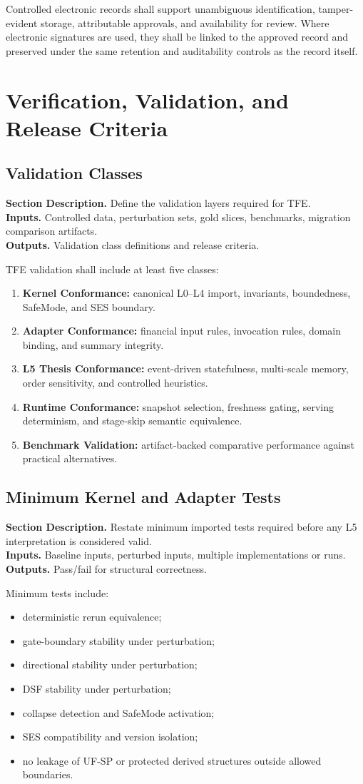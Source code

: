 \documentclass[11pt]{report}
\newcommand{\meta}[3]{\textbf{Section Description.} #1\\
\textbf{Inputs.} #2\\
\textbf{Outputs.} #3\par}
\begin{document}
Controlled electronic records shall support unambiguous identification, tamper-evident storage, attributable approvals, and availability for review. Where electronic signatures are used, they shall be linked to the approved record and preserved under the same retention and auditability controls as the record itself.

\chapter{Verification, Validation, and Release Criteria}
\section{Validation Classes}
\meta{Define the validation layers required for TFE.}{Controlled data, perturbation sets, gold slices, benchmarks, migration comparison artifacts.}{Validation class definitions and release criteria.}

TFE validation shall include at least five classes:
\begin{enumerate}[leftmargin=1.2cm]
    \item \textbf{Kernel Conformance:} canonical L0--L4 import, invariants, boundedness, SafeMode, and SES boundary.
    \item \textbf{Adapter Conformance:} financial input rules, invocation rules, domain binding, and summary integrity.
    \item \textbf{L5 Thesis Conformance:} event-driven statefulness, multi-scale memory, order sensitivity, and controlled heuristics.
    \item \textbf{Runtime Conformance:} snapshot selection, freshness gating, serving determinism, and stage-skip semantic equivalence.
    \item \textbf{Benchmark Validation:} artifact-backed comparative performance against practical alternatives.
\end{enumerate}

\section{Minimum Kernel and Adapter Tests}
\meta{Restate minimum imported tests required before any L5 interpretation is considered valid.}{Baseline inputs, perturbed inputs, multiple implementations or runs.}{Pass/fail for structural correctness.}

Minimum tests include:
\begin{itemize}
    \item deterministic rerun equivalence;
    \item gate-boundary stability under perturbation;
    \item directional stability under perturbation;
    \item DSF stability under perturbation;
    \item collapse detection and SafeMode activation;
    \item SES compatibility and version isolation;
    \item no leakage of UF-SP or protected derived structures outside allowed boundaries.
\end{itemize}
\end{document}
